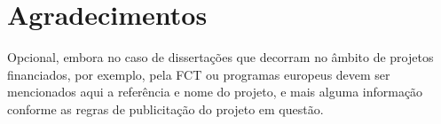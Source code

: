 \chapter{Agradecimentos}
Opcional, embora no caso de dissertações que decorram no âmbito de projetos financiados, por exemplo, pela FCT ou programas europeus devem ser mencionados aqui a referência e nome do projeto, e mais alguma informação conforme as regras de publicitação do projeto em questão.

\vspace{10mm} %

